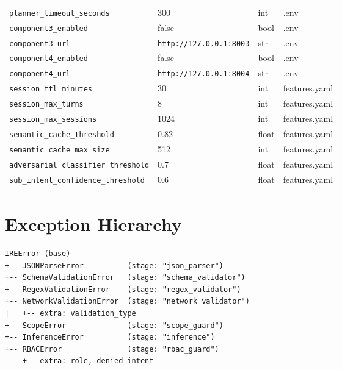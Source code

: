 ﻿\documentclass[10pt,journal,onecolumn]{IEEEtran}
\begin{document}
\begin{table}[t]
\begin{tabularx}{\textwidth}{>{\ttfamily}l X l l}
\texttt{planner\_timeout\_seconds} & 300 & int & .env\\
\texttt{component3\_enabled} & false & bool & .env\\
\texttt{component3\_url} & \texttt{http://127.0.0.1:8003} & str & .env\\
\texttt{component4\_enabled} & false & bool & .env\\
\texttt{component4\_url} & \texttt{http://127.0.0.1:8004} & str & .env\\
\texttt{session\_ttl\_minutes} & 30 & int & features.yaml\\
\texttt{session\_max\_turns} & 8 & int & features.yaml\\
\texttt{session\_max\_sessions} & 1024 & int & features.yaml\\
\texttt{semantic\_cache\_threshold} & 0.82 & float & features.yaml\\
\texttt{semantic\_cache\_max\_size} & 512 & int & features.yaml\\
\texttt{adversarial\_classifier\_threshold} & 0.7 & float & features.yaml\\
\texttt{sub\_intent\_confidence\_threshold} & 0.6 & float & features.yaml\\
\bottomrule
\end{tabularx}
\end{table}

\section{Exception Hierarchy}
\begin{lstlisting}
IREError (base)
+-- JSONParseError          (stage: "json_parser")
+-- SchemaValidationError   (stage: "schema_validator")
+-- RegexValidationError    (stage: "regex_validator")
+-- NetworkValidationError  (stage: "network_validator")
|   +-- extra: validation_type
+-- ScopeError              (stage: "scope_guard")
+-- InferenceError          (stage: "inference")
+-- RBACError               (stage: "rbac_guard")
    +-- extra: role, denied_intent
\end{lstlisting}
\end{document}
